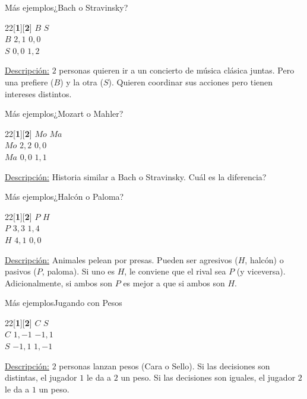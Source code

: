 \documentclass[notes, 11pt]{beamer} %
\begin{document}
\begin{frame}{M\'as ejemplos}{¿Bach o Stravinsky?}
\begin{center}
	 \begin{game}{2}{2}[\textbf{1}][\textbf{2}]
                  \>$B$         \>$S$\\
        $B$       \>$2,1$       \>$0,0$\\
        $S$       \>$0,0$       \>$1,2$
 \end{game}
\end{center}
\underline{Descripci\'on:} $2$ personas quieren ir a un concierto de m\'usica cl\'asica juntas. Pero una prefiere ($B$) y la otra ($S$). Quieren coordinar sus acciones pero tienen intereses distintos.
\end{frame}

\begin{frame}{M\'as ejemplos}{¿Mozart o Mahler?}
\begin{center}
	 \begin{game}{2}{2}[\textbf{1}][\textbf{2}]
                  \>$Mo$         \>$Ma$\\
        $Mo$       \>$2,2$       \>$0,0$\\
        $Ma$       \>$0,0$       \>$1,1$
 \end{game}
\end{center}
\underline{Descripci\'on:} Historia similar a Bach o Stravinsky. Cu\'al es la diferencia?
\end{frame}

\begin{frame}{M\'as ejemplos}{¿Halc\'on o Paloma?}
\begin{center}
	 \begin{game}{2}{2}[\textbf{1}][\textbf{2}]
                  \>$P$         \>$H$\\
        $P$       \>$3,3$       \>$1,4$\\
        $H$       \>$4,1$       \>$0,0$
 \end{game}
\end{center}
\underline{Descripci\'on:} Animales pelean por presas. Pueden ser agresivos ($H$, halc\'on) o pasivos ($P$, paloma). Si uno es $H$, le conviene que el rival sea 
$P$ (y viceversa). Adicionalmente, si ambos son $P$ es mejor a que si ambos son $H$.
\end{frame}

\begin{frame}{M\'as ejemplos}{Jugando con Pesos}
\begin{center}
	 \begin{game}{2}{2}[\textbf{1}][\textbf{2}]
                  \>$C$         \>$S$\\
        $C$       \>$1,-1$       \>$-1,1$\\
        $S$       \>$-1,1$       \>$1,-1$
 \end{game}
\end{center}
\underline{Descripci\'on:} $2$ personas lanzan pesos (Cara o Sello). Si las decisiones son distintas, el jugador $1$ le da a $2$ un peso. Si las decisiones son iguales, el jugador 
$2$ le da a $1$ un peso. 
\end{frame}
\end{document}
